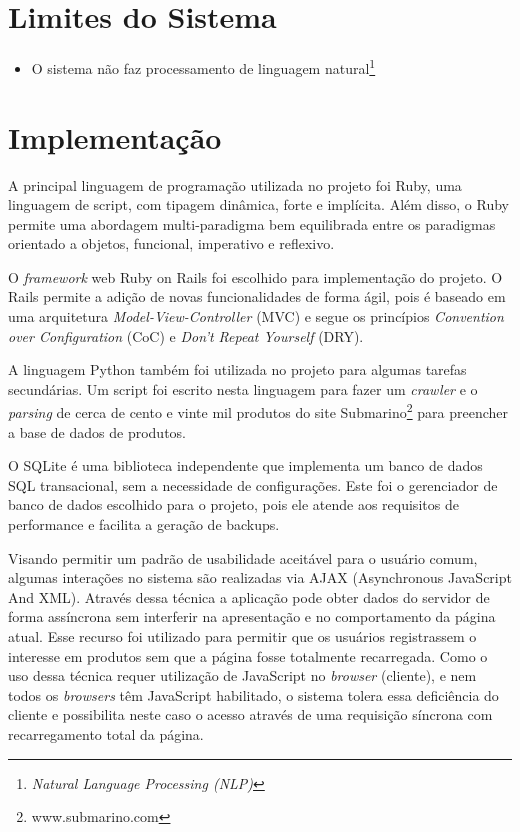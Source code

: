 \section{Limites do Sistema}

\begin{itemize}
  
    \item O sistema não faz processamento de linguagem natural\footnote{\textit{Natural Language Processing (NLP)}}

\end{itemize}

\section{Implementação} %
\label{sec:implementacao}

A principal linguagem de programação utilizada no projeto foi Ruby, uma linguagem de script, com tipagem dinâmica, forte e implícita. Além disso, o Ruby permite uma abordagem multi-paradigma bem equilibrada entre os paradigmas orientado a objetos, funcional, imperativo e reflexivo. 

O \emph{framework} web Ruby on Rails foi escolhido para implementação do projeto. O Rails permite a adição de novas funcionalidades de forma ágil, pois é baseado em uma arquitetura \emph{Model-View-Controller}\cite{burbeck1992applications} (MVC) e segue os princípios \emph{Convention over Configuration}\cite{ruby2009agile} (CoC) e \emph{Don't Repeat Yourself}\cite{hunt-don} (DRY).

A linguagem Python também foi utilizada no projeto para algumas tarefas secundárias. Um script foi escrito nesta linguagem para fazer um \emph{crawler} e o \emph{parsing} de cerca de cento e vinte mil produtos do site Submarino\footnote{www.submarino.com} para preencher a base de dados de produtos.

O SQLite é uma biblioteca independente que implementa um banco de dados SQL transacional, sem a necessidade de configurações. Este foi o gerenciador de banco de dados escolhido para o projeto, pois ele atende aos requisitos de performance e facilita a geração de backups.

Visando permitir um padrão de usabilidade aceitável para o usuário comum, algumas interações no sistema são realizadas via AJAX (Asynchronous JavaScript And XML). Através dessa técnica a aplicação pode obter dados do servidor de forma assíncrona sem interferir na apresentação e no comportamento da página atual. Esse recurso foi utilizado para permitir que os usuários registrassem o interesse em produtos sem que a página fosse totalmente recarregada. Como o uso dessa técnica requer utilização de JavaScript no \emph{browser} (cliente), e nem todos os \emph{browsers} têm JavaScript habilitado, o sistema tolera essa deficiência do cliente e possibilita neste caso o acesso através de uma requisição síncrona com recarregamento total da página.

